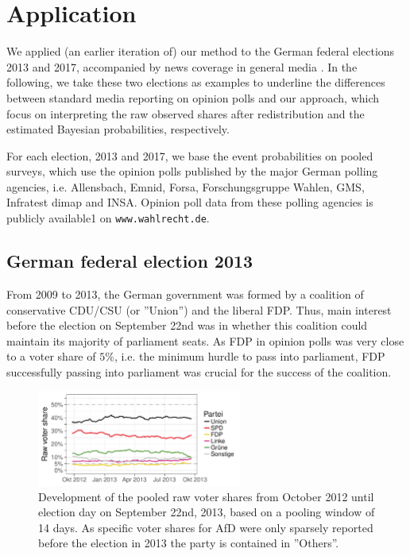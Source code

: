 \documentclass[smallcondensed]{svjour3}     %
\begin{document}
\section{Application} \label{sec:application}
We applied (an earlier iteration of) our method to the German federal elections
2013 and 2017, accompanied by news coverage in general media \citep[cf.][]{wahlistik_2013, gelitz_2017}.
In the following, we take these two elections as examples to underline
the differences between standard media reporting on opinion polls and our approach,
which focus on interpreting the raw observed shares after redistribution and
the estimated Bayesian probabilities, respectively.

For each election, 2013 and 2017, we base the event probabilities on
pooled surveys, which use the opinion polls published by the major
German polling agencies, i.e. Allensbach, Emnid, Forsa, Forschungsgruppe Wahlen,
GMS, Infratest dimap and INSA.
Opinion poll data from these polling agencies is publicly available1
on \texttt{www.wahlrecht.de}. 


\subsection{German federal election 2013} \label{subsec:2013}
From 2009 to 2013, the German government was formed by a coalition of 
conservative CDU/CSU (or ''Union'') and the liberal FDP. 
Thus, main interest before the election on September 22nd was in whether this
coalition could maintain its majority of parliament seats. As FDP in opinion
polls was very close to a voter share of $5\%$, i.e. the minimum hurdle to
pass into parliament, FDP successfully passing into parliament was crucial
for the success of the coalition.

\begin{figure}[H]\centering
\includegraphics[width=0.6\textwidth]{figures/2013_pooled_rawShares.pdf}
\caption{Development of the pooled raw voter shares from October 2012 until election day on September 22nd, 2013, based on a pooling window of 14 days.
As specific voter shares for AfD were only sparsely reported before the election in 2013 the party is contained in ''Others''.
\label{fig:2013}
}
\end{figure}
\end{document}
